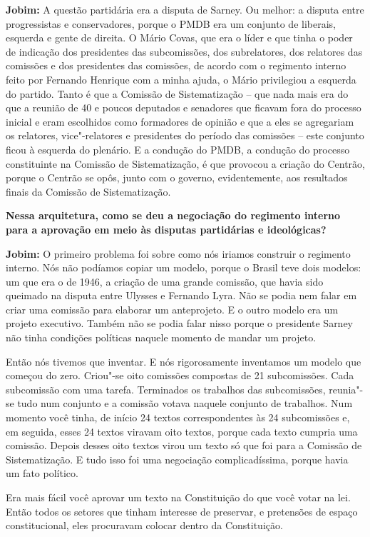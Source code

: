\textbf{Jobim:} A questão partidária era a disputa de Sarney. Ou melhor:
a disputa entre progressistas e conservadores, porque o PMDB era um
conjunto de liberais, esquerda e gente de direita. O Mário Covas, que
era o líder e que tinha o poder de indicação dos presidentes das
subcomissões, dos subrelatores, dos relatores das comissões e dos
presidentes das comissões, de acordo com o regimento interno feito por
Fernando Henrique com a minha ajuda, o Mário privilegiou a esquerda do
partido. Tanto é que a Comissão de Sistematização -- que nada mais era
do que a reunião de 40 e poucos deputados e senadores que ficavam fora
do processo inicial e eram escolhidos como formadores de opinião e que a
eles se agregariam os relatores, vice"-relatores e presidentes do período
das comissões -- este conjunto ficou à esquerda do plenário. E a
condução do PMDB, a condução do processo constituinte na Comissão de
Sistematização, é que provocou a criação do Centrão, porque o Centrão se
opôs, junto com o governo, evidentemente, aos resultados finais da
Comissão de Sistematização.

\textbf{Nessa arquitetura, como se deu a negociação do regimento interno
para a aprovação em meio às disputas partidárias e ideológicas?}

\textbf{Jobim:} O primeiro problema foi sobre como nós iriamos construir
o regimento interno. Nós não podíamos copiar um modelo, porque o Brasil
teve dois modelos: um que era o de 1946, a criação de uma grande
comissão, que havia sido queimado na disputa entre Ulysses e Fernando
Lyra. Não se podia nem falar em criar uma comissão para elaborar um
anteprojeto. E o outro modelo era um projeto executivo. Também não se
podia falar nisso porque o presidente Sarney não tinha condições
políticas naquele momento de mandar um projeto.

Então nós tivemos que inventar. E nós rigorosamente inventamos um modelo
que começou do zero. Criou"-se oito comissões compostas de 21
subcomissões. Cada subcomissão com uma tarefa. Terminados os trabalhos
das subcomissões, reunia"-se tudo num conjunto e a comissão votava
naquele conjunto de trabalhos. Num momento você tinha, de início 24
textos correspondentes às 24 subcomissões e, em seguida, esses 24 textos
viravam oito textos, porque cada texto cumpria uma comissão. Depois
desses oito textos virou um texto só que foi para a Comissão de
Sistematização. E tudo isso foi uma negociação complicadíssima, porque
havia um fato político.

Era mais fácil você aprovar um texto na Constituição do que você votar
na lei. Então todos os setores que tinham interesse de preservar, e
pretensões de espaço constitucional, eles procuravam colocar dentro da
Constituição.

